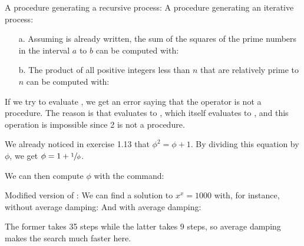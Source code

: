 \begin{exe}[1.33]
    A  procedure generating a recursive process:
    A  procedure generating an iterative process:
    \begin{itemize}
        \item[a.] Assuming  is already written, the sum of the 
            squares of the prime numbers in the interval $a$ to $b$ can be 
            computed with:
        \item[b.] The product of all positive integers less than $n$ that are 
            relatively prime to $n$ can be computed with:
    \end{itemize}
\end{exe}

\begin{exe}[1.34]
    If we try to evaluate , we get an error saying that the operator 
    is not a procedure. The reason is that  evaluates to
    , which itself evaluates to , and this operation is 
    impossible since 2 is not a procedure.
\end{exe}

\begin{exe}[1.35]
    We already noticed in exercise 1.13 that $\phi^2 = \phi + 1$. By dividing 
    this equation by $\phi$, we get $\phi = 1 + \sfrac{1}{\phi}$.

    We can then compute $\phi$ with the command:
\end{exe}

\begin{exe}[1.36]
    Modified version of :
    We can find a solution to $x^x = 1000$ with, for instance, without average 
    damping:
    And with average damping:

    The former takes 35 steps while the latter takes 9 steps, so average damping 
    makes the search much faster here.
\end{exe}

